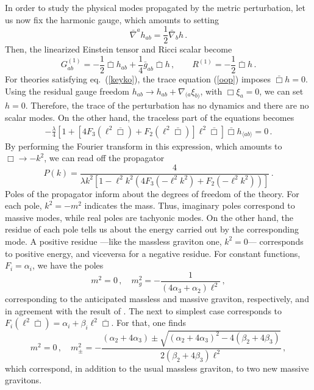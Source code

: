 \documentclass[11pt]{article}
\newcommand{\req}[1]{(\ref{#1})} %
\newcommand{\bea}{\begin{eqnarray}}
\newcommand{\eea}{\end{eqnarray}}
\renewcommand{\req}[1]{eq.~(\ref{#1})}
\begin{document}
In order to study the physical modes propagated by the metric perturbation, let us now fix the harmonic gauge, which amounts to setting
\begin{equation}
\bar\nabla^a h_{ab}= \frac{1}{2}\bar\nabla_b h\, .
\end{equation} 
Then, the linearized Einstein tensor and Ricci scalar become
\begin{equation}
G_{ab}^{(1)}=-\frac{1}{2}\bar\Box h_{ab}+\frac{1}{4}\bar g_{ab} \bar\Box h\, , \qquad R^{(1)}=-\frac{1}{2}\bar\Box h\, .
\end{equation}
For theories satisfying \req{keyko}, the trace equation (\ref{oop}) imposes $\bar\Box h=0$. Using the residual gauge freedom $h_{ab}\rightarrow h_{ab}+\nabla_{(a}\xi_{b)}$, with $\Box\xi_a=0$, we can set $h=0$. Therefore, the trace of the perturbation has no dynamics and there are no scalar modes. On the other hand, the traceless part of the equations becomes
\bea\label{tracelesss}
-\frac{\lambda}{4} \left[1+\left[4F_3(\ell^2 \bar \Box)+F_2(\ell^2 \bar \Box)\right]\ell^2\bar\Box \right] \bar \Box h_{\langle a b \rangle}=0\, .
\eea
By performing the Fourier transform in this expression, which amounts to $\Box\rightarrow -k^2$, we can read off the propagator
\begin{equation}
P(k)=\frac{4}{\lambda k^2\left[1-   \ell^2 k^2 \left(4F_3(-\ell^2 k^2)+F_2(-\ell^2 k^2)\right)\right]}\, .
\end{equation}
Poles of the propagator inform about the degrees of freedom of the theory. For each pole, $k^2=-m^2$ indicates the mass. Thus, imaginary poles correspond to massive modes, while real poles are tachyonic modes. On the other hand, the residue of each pole tells us about the energy carried out by the corresponding mode. A positive residue ---like the massless graviton one, $k^2=0$--- corresponds to positive energy, and viceversa for a negative residue. For constant functions, $F_i=\alpha_i$, we have the poles
\begin{equation}
m^2=0\, , \quad m_g^2=-\frac{1}{(4\alpha_3+\alpha_2)\ell^2}\, ,
\end{equation}
corresponding to the anticipated massless and massive graviton, respectively, and in agreement with the result of \cite{Aspects,Sisman:2011gz}. The next to simplest case corresponds to
$F_i(\ell^2 \bar \Box)=\alpha_i+\beta_i \ell^2\bar \Box $. For that, one finds 
\begin{equation}
m^2=0\, , \quad m_{\pm}^2=-\frac{(\alpha_2+4\alpha_3)\pm \sqrt{ (\alpha_2+4\alpha_3)^2 - 4 (\beta_2+4\beta_3)}}{2(\beta_2+4\beta_3)\ell^2} \, ,
\end{equation}
which correspond, in addition to the usual massless graviton, to two new massive gravitons.
\end{document}
